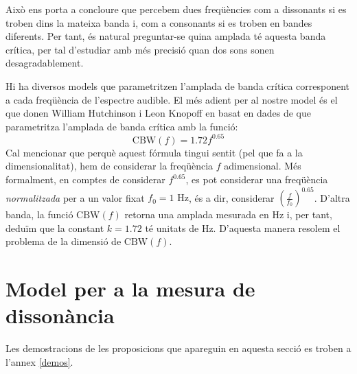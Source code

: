 \documentclass{article}
\theoremstyle{math}
\theoremstyle{TheoremNum}
\newcommand{\0}{\ensuremath{\vb{0}}}
\newcommand\Hz{\text{ Hz}}
\begin{document}
Això ens porta a concloure que percebem dues freqüències com a dissonants si es troben dins la mateixa banda i, com a consonants si es troben en bandes diferents. Per tant, és natural preguntar-se quina amplada té aquesta banda crítica, per tal d'estudiar amb més precisió quan dos sons sonen desagradablement.\par
Hi ha diversos models que parametritzen l'amplada de banda crítica corresponent a cada freqüència de l'espectre audible. El més adient per al nostre model és el que donen William Hutchinson i Leon Knopoff en \cite{hutchinson} basat en dades de \cite{plomp,goodwin,mayer} que parametritza l'amplada de banda crítica amb la funció:
\begin{equation}
  \text{CBW}(f)=1.72 f^{0.65}
  \label{CBW}
\end{equation}
Cal mencionar que perquè aquest fórmula tingui sentit (pel que fa a la dimensionalitat), hem de considerar la freqüència $f$ adimensional. Més formalment, en comptes de considerar $f^{0.65}$, es pot considerar una freqüència \textit{normalitzada} per a un valor fixat $f_0=1\Hz$, és a dir, considerar ${\left(\frac{f}{f_0}\right)}^{0.65}$. D'altra banda, la funció $\text{CBW}(f)$ retorna una amplada mesurada en Hz i, per tant, deduïm que la constant $k=1.72$ té unitats de Hz. D'aquesta manera resolem el problema de la dimensió de $\text{CBW}(f)$.
\section{Model per a la mesura de dissonància}\label{model}
\noindent Les demostracions de les proposicions que apareguin en aquesta secció es troben a l'annex \ref{demos}.
\end{document}
